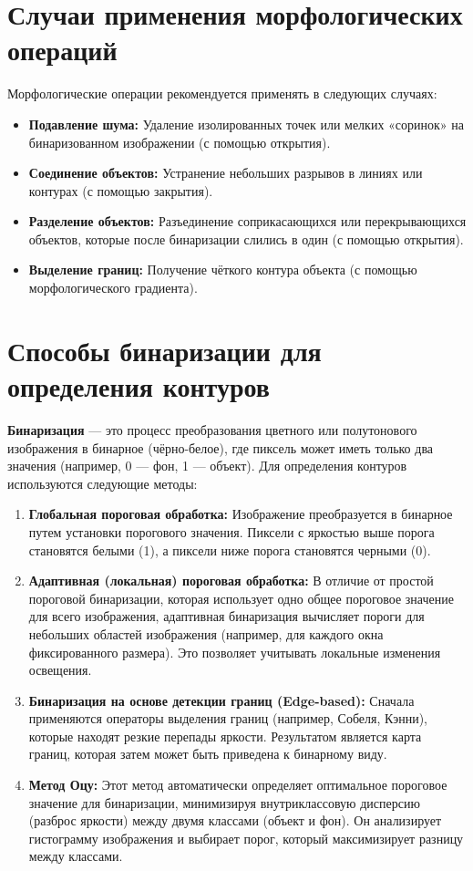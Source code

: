 \documentclass[12pt,a4paper]{article}
\begin{document}
\section{Случаи применения морфологических операций}

Морфологические операции рекомендуется применять в следующих случаях:
\begin{itemize}
    \item \textbf{Подавление шума:} Удаление изолированных точек или мелких «соринок» на бинаризованном изображении (с помощью открытия).
    \item \textbf{Соединение объектов:} Устранение небольших разрывов в линиях или контурах (с помощью закрытия).
    \item \textbf{Разделение объектов:} Разъединение соприкасающихся или перекрывающихся объектов, которые после бинаризации слились в один (с помощью открытия).
    \item \textbf{Выделение границ:} Получение чёткого контура объекта (с помощью морфологического градиента).
\end{itemize}

\section{Способы бинаризации для определения контуров}

\textbf{Бинаризация} --- это процесс преобразования цветного или полутонового изображения в бинарное (чёрно-белое), где пиксель может иметь только два значения (например, 0 --- фон, 1 --- объект). Для определения контуров используются следующие методы:

\begin{enumerate}
    \item \textbf{Глобальная пороговая обработка:} Изображение преобразуется в бинарное путем установки порогового значения. Пиксели с яркостью выше порога становятся белыми (1), а пиксели ниже порога становятся черными (0). 
    \item \textbf{Адаптивная (локальная) пороговая обработка:} В отличие от простой пороговой бинаризации, которая использует одно общее пороговое значение для всего изображения, адаптивная бинаризация вычисляет пороги для небольших областей изображения (например, для каждого окна фиксированного размера). Это позволяет учитывать локальные изменения освещения.
    \item \textbf{Бинаризация на основе детекции границ (Edge-based):} Сначала применяются операторы выделения границ (например, Собеля, Кэнни), которые находят резкие перепады яркости. Результатом является карта границ, которая затем может быть приведена к бинарному виду.
    \item \textbf{Метод Оцу:} Этот метод автоматически определяет оптимальное пороговое значение для бинаризации, минимизируя внутриклассовую дисперсию (разброс яркости) между двумя классами (объект и фон). Он анализирует гистограмму изображения и выбирает порог, который максимизирует разницу между классами.
\end{enumerate}
\end{document}
